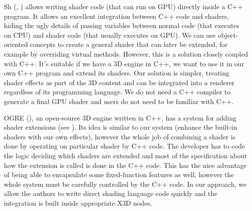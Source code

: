 \documentclass{egpubl}
\begin{document}


Sh (, \cite{sh:book})
allows writing shader code (that can run on GPU) directly inside a
C++ program.
It allows an excellent
integration between C++ code and shaders, hiding the ugly details of
passing variables between normal code (that executes on CPU) and
shader code (that usually executes on GPU). We can use
object-oriented concepts to create a general shader that can
later be extended, for example by overriding virtual
methods. However, this is a solution closely coupled with C++. It's
suitable if we have a 3D engine in C++, we want to use it in
our own C++ program and extend its shaders. Our solution is simpler,
treating shader effects as part of the 3D content and can
be integrated into a renderer regardless of its programming language.
We do not need a C++ compiler to generate a final GPU shader
and users do not need to be familiar with C++.

OGRE (), an open-source 3D engine written in C++, has a system
for adding shader extensions (see \cite{ogre:shader}). Its idea is similar
to our system (enhance the built-in shaders with our own effects),
however the whole job of combining a shader is done by operating
on particular shader by C++ code. The developer has to code
the logic deciding which shaders are extended and most of the specification
about how the extension is called is done in the C++ code.
This has the nice advantage of being able to encapsulate some fixed-function
features as well, however the whole system must be carefully controlled by
the C++ code.
In our approach, we allow the authors to write direct shading
language code quickly and the integration is built inside appropriate X3D nodes.
\end{document}
